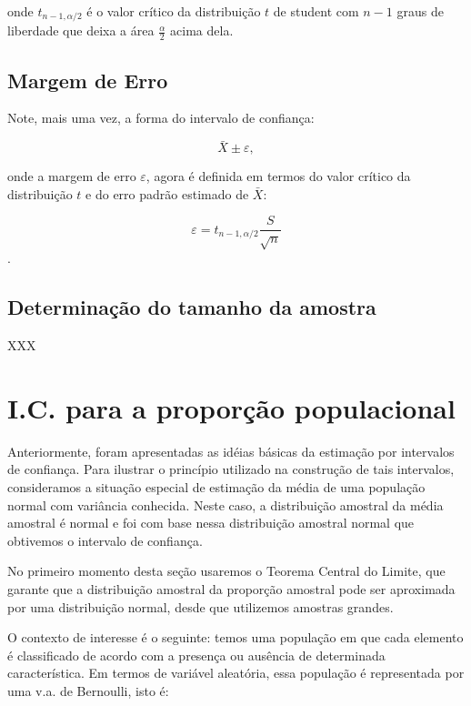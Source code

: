 \documentclass[
]{book}
\begin{document}
onde \(t_{n-1,\alpha/2}\) é o valor crítico da distribuição \(t\) de student com \(n-1\) graus de liberdade que deixa a área \(\frac{\alpha}{2}\) acima dela.

\hypertarget{margem-de-erro-1}{%
\subsection{Margem de Erro}\label{margem-de-erro-1}}

Note, mais uma vez, a forma do intervalo de confiança:

\[\bar X \pm\varepsilon,\]

onde a margem de erro \(\varepsilon\), agora é definida em termos do valor crítico da distribuição \(t\) e do erro padrão estimado de \(\bar X\):

\[\varepsilon=t_{n-1,\alpha/2}\frac{S}{\sqrt{n}}\].

\hypertarget{determinauxe7uxe3o-do-tamanho-da-amostra-1}{%
\subsection{Determinação do tamanho da amostra}\label{determinauxe7uxe3o-do-tamanho-da-amostra-1}}

XXX

\hypertarget{i.c.-para-a-proporuxe7uxe3o-populacional}{%
\section{I.C. para a proporção populacional}\label{i.c.-para-a-proporuxe7uxe3o-populacional}}

Anteriormente, foram apresentadas as idéias básicas da estimação por intervalos de confiança. Para ilustrar o princípio utilizado na construção de tais intervalos, consideramos a situação especial de estimação da média de uma população normal com variância conhecida. Neste caso, a distribuição amostral da média amostral é normal e foi com base nessa distribuição amostral normal que obtivemos o intervalo de confiança.

No primeiro momento desta seção usaremos o Teorema Central do Limite, que garante que a distribuição amostral da proporção amostral pode ser aproximada por uma distribuição normal, desde que utilizemos amostras grandes.

O contexto de interesse é o seguinte: temos uma população em que cada elemento é classificado de acordo com a presença ou ausência de determinada característica. Em termos de variável aleatória, essa população é representada por uma v.a. de Bernoulli, isto é:
\end{document}
